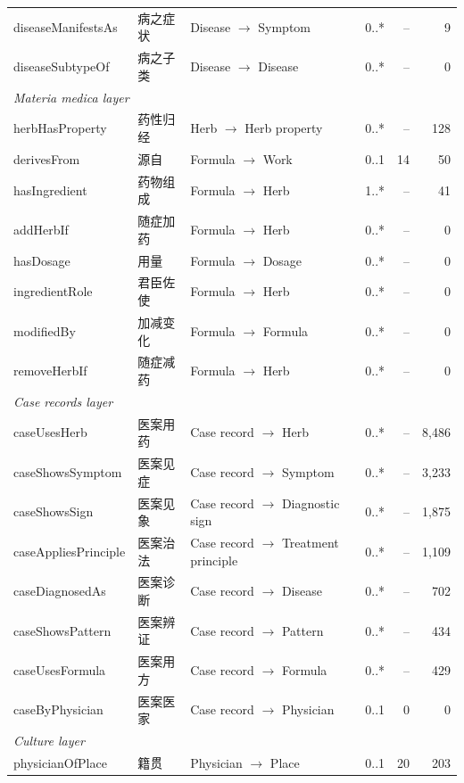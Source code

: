 \begin{table}[p]
\begin{threeparttable}
\begin{tabularx}{\linewidth}{llXlrr}
diseaseManifestsAs & 病之症状 & Disease $\rightarrow$ Symptom & 0..* & -- & 9 \\
diseaseSubtypeOf \textdagger{} & 病之子类 & Disease $\rightarrow$ Disease & 0..* & -- & 0 \\
\multicolumn{6}{l}{\textit{Materia medica layer}} \\
herbHasProperty & 药性归经 & Herb $\rightarrow$ Herb property & 0..* & -- & 128 \\
derivesFrom & 源自 & Formula $\rightarrow$ Work & 0..1 & 14 & 50 \\
hasIngredient & 药物组成 & Formula $\rightarrow$ Herb & 1..* & -- & 41 \\
addHerbIf \textdagger{} & 随症加药 & Formula $\rightarrow$ Herb & 0..* & -- & 0 \\
hasDosage \textdagger{} & 用量 & Formula $\rightarrow$ Dosage & 0..* & -- & 0 \\
ingredientRole \textdagger{} & 君臣佐使 & Formula $\rightarrow$ Herb & 0..* & -- & 0 \\
modifiedBy \textdagger{} & 加减变化 & Formula $\rightarrow$ Formula & 0..* & -- & 0 \\
removeHerbIf \textdagger{} & 随症减药 & Formula $\rightarrow$ Herb & 0..* & -- & 0 \\
\multicolumn{6}{l}{\textit{Case records layer}} \\
caseUsesHerb & 医案用药 & Case record $\rightarrow$ Herb & 0..* & -- & 8,486 \\
caseShowsSymptom & 医案见症 & Case record $\rightarrow$ Symptom & 0..* & -- & 3,233 \\
caseShowsSign & 医案见象 & Case record $\rightarrow$ Diagnostic sign & 0..* & -- & 1,875 \\
caseAppliesPrinciple & 医案治法 & Case record $\rightarrow$ Treatment principle & 0..* & -- & 1,109 \\
caseDiagnosedAs & 医案诊断 & Case record $\rightarrow$ Disease & 0..* & -- & 702 \\
caseShowsPattern & 医案辨证 & Case record $\rightarrow$ Pattern & 0..* & -- & 434 \\
caseUsesFormula & 医案用方 & Case record $\rightarrow$ Formula & 0..* & -- & 429 \\
caseByPhysician \textdagger{} & 医案医家 & Case record $\rightarrow$ Physician & 0..1 & 0 & 0 \\
\multicolumn{6}{l}{\textit{Culture layer}} \\
physicianOfPlace & 籍贯 & Physician $\rightarrow$ Place & 0..1 & 20 & 203 \\

\end{tabularx}
\end{threeparttable}
\end{table}
